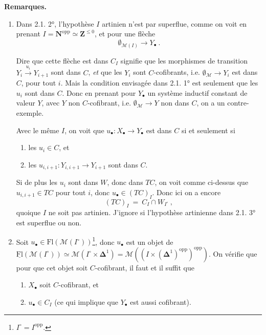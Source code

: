 \documentclass[11pt]{article}
\newcommand{\printedpage}[1]{\marginpar{\footnotesize p.~#1}}
\newcommand{\msp}[1]{\marginpar{\footnotesize [#1]}}
\newcommand{\M}{\mathcal{M}}
\begin{document}
\noindent\textbf{Remarques.}
\begin{enumerate}[leftmargin=2.5em]
\item[1)] Dans 2.1. 2°, l'hypothèse $I$ artinien n'est par superflue, comme on voit en prenant $I = \mathbf{N}^{\mathrm{opp}} \simeq \mathbf{Z}^{\leq 0}$, \msp{38} et pour une flèche %
\[ \emptyset_{\M(I)} \longrightarrow Y_\bullet\ . \]

Dire que cette flèche est dans $C_I$ signifie que les morphismes de transition $Y_i \xrightarrow{u_i} Y_{i+1}$ sont dans $C$, \textit{et} que les $Y_i$ sont $C$-cofibrants, i.e. $\emptyset_{\M} \longrightarrow Y_i$ est dans $C$, pour tout $i$. Mais la condition envisagée dans 2.1. 1° est seulement que les $u_i$ sont dans $C$. Donc en prenant pour $Y_\bullet$ un système inductif constant de valeur $Y$, avec $Y$ non $C$-cofibrant, i.e. $\emptyset_{\M} \longrightarrow Y$ non dans $C$, on a un contre-exemple.

Avec le même $I$, on voit que $u_\bullet : X_\bullet \longrightarrow Y_\bullet$ est dans $C$ si et seulement si
\begin{enumerate}[leftmargin=2.5em]
\item[a)] les $u_i \in C$, et
\item[b)] les $u_{i,i+1} : Y_{i,i+1} \longrightarrow Y_{i+1}$ sont dans $C$.
\end{enumerate}

\printedpage{21}

Si de plus les $u_i$ sont dans $W$, donc dans $TC$, on voit comme ci-dessus que $u_{i,i+1} \in TC$ pour tout $i$, donc $u_\bullet \in (TC)_I$. Donc ici on a encore
\[ (TC)_I \ = \ C_I \cap W_{I^\circ}\ , \]
quoique $I$ ne soit pas artinien. J'ignore si l'hypothèse artinienne dans 2.1. 3° est superflue ou non.
\item[2)] Soit $u_\bullet \in \mathrm{Fl}(\M(I^\circ))$\footnote[13]{$I^\circ = I^{\mathrm{opp}}$.}, donc $u_\bullet$ est un objet de $\underline{\mathrm{Fl}}(\M(I^\circ)) \simeq \M(I^\circ \times \boldsymbol{\Delta}^1) = \M((I \times (\boldsymbol{\Delta}^1)^{\mathrm{opp}})^{\mathrm{opp}})$. On vérifie que pour que cet objet soit $C$-cofibrant, il faut et il suffit que
\begin{enumerate}[leftmargin=2.5em]
\item[1°)] $X_\bullet$ soit $C$-cofibrant, et
\item[2°)] $u_\bullet \in C_I$ (ce qui implique que $Y_\bullet$ est aussi cofibrant).
\end{enumerate}
\end{enumerate}
\msp{39}
\end{document}
